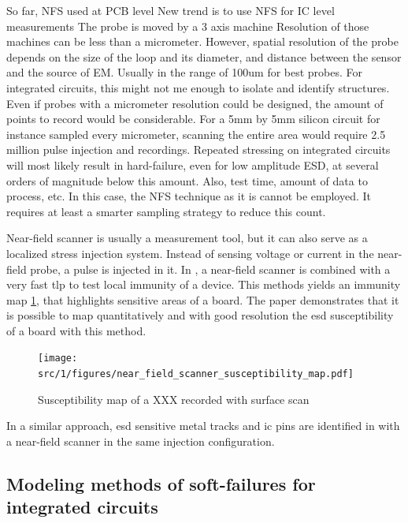 So far, NFS used at PCB level
New trend is to use NFS for IC level measurements
The probe is moved by a 3 axis machine
Resolution of those machines can be less than a micrometer.
However, spatial resolution of the probe depends on the size of the loop and its diameter, and distance between the sensor and the source of EM.
Usually in the range of 100um for best probes.
For integrated circuits, this might not me enough to isolate and identify structures.
Even if probes with a micrometer resolution could be designed, the amount of points to record would be considerable.
For a 5mm by 5mm silicon circuit for instance sampled every micrometer, scanning the entire area would require 2.5 million pulse injection and recordings.
Repeated stressing on integrated circuits will most likely result in hard-failure, even for low amplitude ESD, at several orders of magnitude below this amount.
Also, test time, amount of data to process, etc.
In this case, the NFS technique as it is cannot be employed.
It requires at least a smarter sampling strategy to reduce this count.

Near-field scanner is usually a measurement tool, but it can also serve as a localized stress injection system.
Instead of sensing voltage or current in the near-field probe, a pulse is injected in it.
In \cite{NearFieldInjectionFabrice}, a near-field scanner is combined with a very fast \gls{tlp} to test local immunity of a device.
This methods yields an immunity map \ref{fig:near-field-scan-map}, that highlights sensitive areas of a board.
The paper demonstrates that it is possible to map quantitatively and with good resolution the \gls{esd} susceptibility of a board with this method.

\begin{figure}[!h]
  \centering
  \texttt{[image: src/1/figures/near\_field\_scanner\_susceptibility\_map.pdf]}
  \caption{Susceptibility map of a XXX recorded with surface scan \cite{}}
  \label{fig:near-field-scan-map}
\end{figure}

In a similar approach, \gls{esd} sensitive metal tracks and \gls{ic} pins are identified in \cite{NearFieldInjectionBis} with a near-field scanner in the same injection configuration.

\subsection{Modeling methods of soft-failures for integrated circuits}

